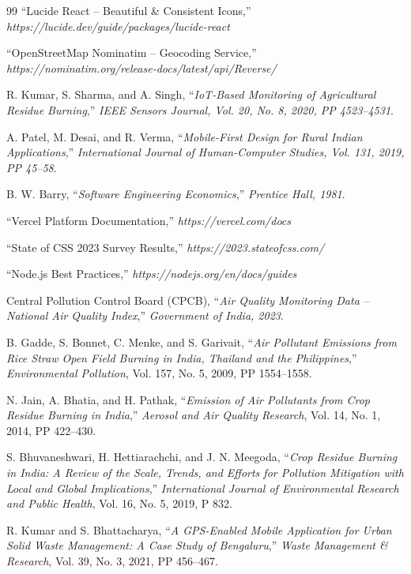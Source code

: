 \documentclass[a4paper,12pt,oneside]{report}
\begin{document}
\begin{thebibliography}{99}
     ``Lucide React -- Beautiful \& Consistent Icons,'' \textit{https://lucide.dev/guide/packages/lucide-react}

     ``OpenStreetMap Nominatim -- Geocoding Service,'' \textit{https://nominatim.org/release-docs/latest/api/Reverse/}

     R. Kumar, S. Sharma, and A. Singh, ``\textit{IoT-Based Monitoring of Agricultural Residue Burning},'' \textit{IEEE Sensors Journal, Vol. 20, No. 8, 2020, PP 4523--4531}.

     A. Patel, M. Desai, and R. Verma, ``\textit{Mobile-First Design for Rural Indian Applications},'' \textit{International Journal of Human-Computer Studies, Vol. 131, 2019, PP 45--58}.

     B. W. Barry, ``\textit{Software Engineering Economics},'' \textit{Prentice Hall, 1981}.

     ``Vercel Platform Documentation,'' \textit{https://vercel.com/docs}

     ``State of CSS 2023 Survey Results,'' \textit{https://2023.stateofcss.com/}

     ``Node.js Best Practices,'' \textit{https://nodejs.org/en/docs/guides}

     Central Pollution Control Board (CPCB), ``\textit{Air Quality Monitoring Data -- National Air Quality Index},'' \textit{Government of India, 2023}.

     B. Gadde, S. Bonnet, C. Menke, and S. Garivait, ``\textit{Air Pollutant Emissions from Rice Straw Open Field Burning in India, Thailand and the Philippines},'' \textit{Environmental Pollution}, Vol. 157, No. 5, 2009, PP 1554--1558.

     N. Jain, A. Bhatia, and H. Pathak, ``\textit{Emission of Air Pollutants from Crop Residue Burning in India},'' \textit{Aerosol and Air Quality Research}, Vol. 14, No. 1, 2014, PP 422--430.

     S. Bhuvaneshwari, H. Hettiarachchi, and J. N. Meegoda, ``\textit{Crop Residue Burning in India: A Review of the Scale, Trends, and Efforts for Pollution Mitigation with Local and Global Implications},'' \textit{International Journal of Environmental Research and Public Health}, Vol. 16, No. 5, 2019, P 832.

     R. Kumar and S. Bhattacharya, ``\textit{A GPS-Enabled Mobile Application for Urban Solid Waste Management: A Case Study of Bengaluru},'' \textit{Waste Management \& Research}, Vol. 39, No. 3, 2021, PP 456--467.


\end{thebibliography}
\end{document}

